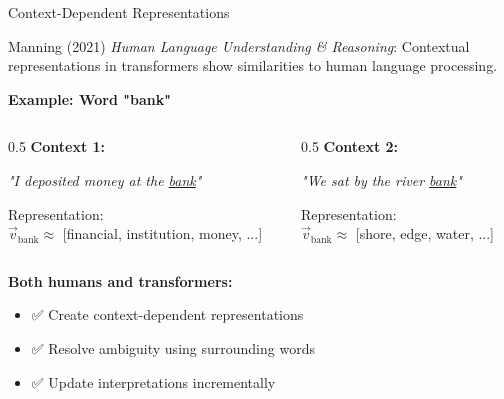 \documentclass[aspectratio=169]{beamer}
\begin{document}
\begin{frame}{Context-Dependent Representations 🔄}
    \begin{block}{Manning (2021)}
        \textit{Human Language Understanding \& Reasoning}: Contextual representations in transformers show similarities to human language processing.
    \end{block}

    \vspace{0.3cm}

    \textbf{Example: Word "bank"}

    \begin{columns}[T]
        \begin{column}{0.5\textwidth}
            \textbf{Context 1:}

            \textit{"I deposited money at the \underline{bank}"}

            \vspace{0.15cm}

            Representation: \\
            $\vec{v}_{\text{bank}} \approx$ [financial, institution, money, ...]
        \end{column}

        \begin{column}{0.5\textwidth}
            \textbf{Context 2:}

            \textit{"We sat by the river \underline{bank}"}

            \vspace{0.15cm}

            Representation: \\
            $\vec{v}_{\text{bank}} \approx$ [shore, edge, water, ...]
        \end{column}
    \end{columns}

    \vspace{0.3cm}

    \textbf{Both humans and transformers:}
    \begin{itemize}\setlength{\itemsep}{0pt}
        \item ✅ Create context-dependent representations
        \item ✅ Resolve ambiguity using surrounding words
        \item ✅ Update interpretations incrementally
    \end{itemize}
\end{frame}
\end{document}
